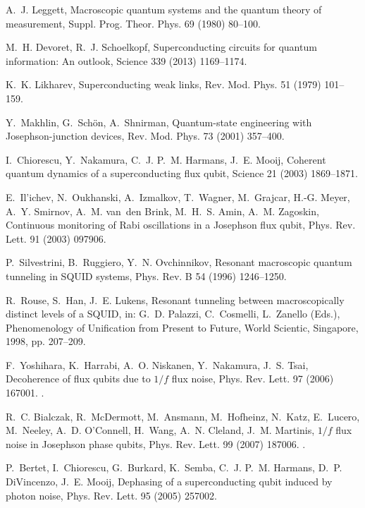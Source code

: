 \documentclass[3p,sort&compress]{elsarticle}
\begin{document}
\begin{thebibliography}{100}
A.~J. Leggett, Macroscopic quantum systems and the quantum theory of
  measurement, Suppl. Prog. Theor. Phys. 69 (1980) 80--100.

M.~H. Devoret, R.~J. Schoelkopf, Superconducting circuits for quantum
  information: An outlook, Science 339 (2013) 1169--1174.

K.~K. Likharev, Superconducting weak links, Rev. Mod. Phys. 51 (1979) 101--159.

Y.~Makhlin, G.~Sch{\"o}n, A.~Shnirman, Quantum-state engineering with
  {J}osephson-junction devices, Rev. Mod. Phys. 73 (2001) 357--400.

I.~Chiorescu, Y.~Nakamura, C.~J. P.~M. Harmans, J.~E. Mooij, Coherent quantum
  dynamics of a superconducting flux qubit, Science 21 (2003) 1869--1871.

E.~Il'ichev, N.~Oukhanski, A.~Izmalkov, T.~Wagner, M.~Grajcar, H.-G. Meyer,
  A.~Y. Smirnov, A.~M. van~den Brink, M.~H.~S. Amin, A.~M. Zagoskin, Continuous
  monitoring of {R}abi oscillations in a {J}osephson flux qubit, Phys. Rev.
  Lett. 91 (2003) 097906.

P.~Silvestrini, B.~Ruggiero, Y.~N. Ovchinnikov, Resonant macroscopic quantum
  tunneling in {SQUID} systems, Phys. Rev. B 54 (1996) 1246--1250.

R.~Rouse, S.~Han, J.~E. Lukens, Resonant tunneling between macroscopically
  distinct levels of a {SQUID}, in: G.~D. Palazzi, C.~Cosmelli, L.~Zanello
  (Eds.), Phenomenology of Unification from Present to Future, World Scientic,
  Singapore, 1998, pp. 207--209.

F.~Yoshihara, K.~Harrabi, A.~O. Niskanen, Y.~Nakamura, J.~S. Tsai, Decoherence
  of flux qubits due to $1/f$ flux noise, Phys. Rev. Lett. 97 (2006) 167001.
\newblock \href {http://dx.doi.org/10.1103/PhysRevLett.97.167001}
  {}.

R.~C. Bialczak, R.~McDermott, M.~Ansmann, M.~Hofheinz, N.~Katz, E.~Lucero,
  M.~Neeley, A.~D. O'Connell, H.~Wang, A.~N. Cleland, J.~M. Martinis, $1/f$
  flux noise in {J}osephson phase qubits, Phys. Rev. Lett. 99 (2007) 187006.
\newblock \href {http://dx.doi.org/10.1103/PhysRevLett.99.187006}
  {}.

P.~Bertet, I.~Chiorescu, G.~Burkard, K.~Semba, C.~J. P.~M. Harmans, D.~P.
  DiVincenzo, J.~E. Mooij, Dephasing of a superconducting qubit induced by
  photon noise, Phys. Rev. Lett. 95 (2005) 257002.


\end{thebibliography}
\end{document}
